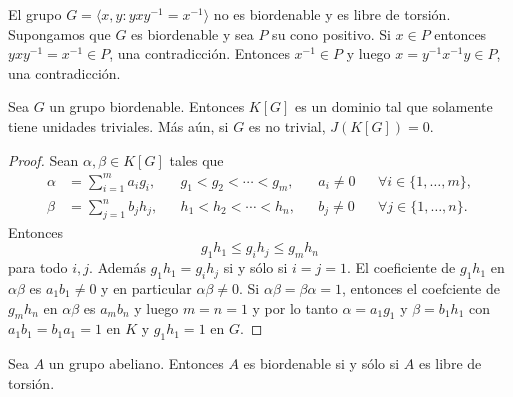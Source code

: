 \begin{example}
	El grupo $G=\langle x,y:yxy^{-1}=x^{-1}\rangle$ no es biordenable y es libre de torsión. 
	Supongamos que $G$ es biordenable y sea $P$ su cono positivo. Si $x\in P$
	entonces $yxy^{-1}=x^{-1}\in P$, una contradicción. Entonces $x^{-1}\in P$
	y luego $x=y^{-1}x^{-1}y\in P$, una contradicción.
\end{example}

\begin{theorem}
	\label{thm:BO}
	Sea $G$ un grupo biordenable. Entonces $K[G]$ es un dominio tal que
	solamente tiene unidades triviales. Más aún, si $G$ es no trivial,
	$J(K[G])=0$. 
\end{theorem}

\begin{proof}
	Sean $\alpha,\beta\in K[G]$ tales que 
	\begin{align*}
		\alpha&=\sum_{i=1}^m a_ig_i, && g_1<g_2<\cdots<g_m,&& a_i\ne 0 && \forall i\in\{1,\dots,m\},\\
		\beta&=\sum_{j=1}^n b_jh_j, && h_1<h_2<\cdots<h_n, && b_j\ne 0 && \forall j\in\{1,\dots,n\}.
	\end{align*}
	Entonces 
	\[
		g_1h_1\leq g_ih_j\leq g_mh_n
	\]
	para todo $i,j$. Además $g_1h_1=g_ih_j$ si y sólo si $i=j=1$. El
	coeficiente de $g_1h_1$ en $\alpha\beta$ es $a_1b_1\ne 0$ y en particular
	$\alpha\beta\ne0$. Si $\alpha\beta=\beta\alpha=1$, entonces el coefciente
	de $g_mh_n$ en $\alpha\beta$ es $a_mb_n$ y luego $m=n=1$ y por lo tanto
	$\alpha=a_1g_1$ y $\beta=b_1h_1$ con $a_1b_1=b_1a_1=1$ en $K$ y $g_1h_1=1$
	en $G$.
\end{proof}

\begin{theorem}[Levi]
	\label{thm:Levi}
	Sea $A$ un grupo abeliano. Entonces $A$ es biordenable si y sólo si $A$ es
	libre de torsión.
\end{theorem}

